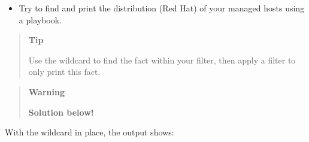 \begin{itemize}
\tightlist
\item
  Try to find and print the distribution (Red Hat) of your managed hosts
  using a playbook.
\end{itemize}

\begin{quote}
\textbf{Tip}

Use the wildcard to find the fact within your filter, then apply a
filter to only print this fact.
\end{quote}

\begin{quote}
\textbf{Warning}

\textbf{Solution below!}
\end{quote}

\begin{Shaded}
\begin{Highlighting}[]
\PreprocessorTok{{-}{-}{-}}
\KeywordTok{{-}}\AttributeTok{ }\KeywordTok{:}
\AttributeTok{  }\KeywordTok{:}
\AttributeTok{  }\KeywordTok{:}
\AttributeTok{    }\KeywordTok{{-}}\AttributeTok{ }\KeywordTok{:}
\AttributeTok{      }\KeywordTok{:}
\AttributeTok{        }\KeywordTok{:}
\AttributeTok{          }\KeywordTok{{-}}\AttributeTok{ }
\AttributeTok{      }\KeywordTok{:}
\AttributeTok{    }\KeywordTok{{-}}\AttributeTok{ }\KeywordTok{:}
\AttributeTok{        }\KeywordTok{:}
\end{Highlighting}
\end{Shaded}

With the wildcard in place, the output shows:

\begin{Shaded}
\begin{Highlighting}[]

 \PreprocessorTok{[}\PreprocessorTok{]} \PreprocessorTok{*******************************************************************}
 \PreprocessorTok{[}\PreprocessorTok{]}\NormalTok{ =}\OperatorTok{\textgreater{}}\NormalTok{ \{}
    \ExtensionTok{:}\NormalTok{ \{}
        \ExtensionTok{:}\NormalTok{ \{}
            \ExtensionTok{:} 
        \ExtensionTok{\},}
        \ExtensionTok{:}
        \ExtensionTok{:}
    \ExtensionTok{\}}
\ExtensionTok{\}}
\end{Highlighting}
\end{Shaded}

